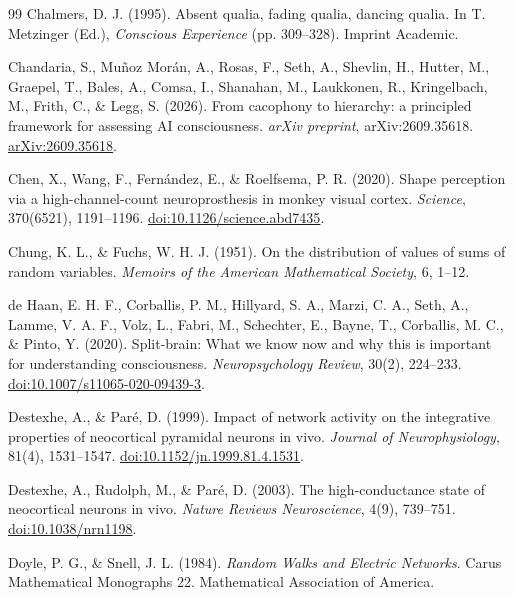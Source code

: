 \begin{thebibliography}{99}
 Chalmers, D. J. (1995). Absent qualia, fading qualia, dancing qualia. In T. Metzinger (Ed.), \textit{Conscious Experience} (pp. 309--328). Imprint Academic.

 Chandaria, S., Mu\~noz Mor\'an, A., Rosas, F., Seth, A., Shevlin, H., Hutter, M., Graepel, T., Bales, A., Comsa, I., Shanahan, M., Laukkonen, R., Kringelbach, M., Frith, C., \& Legg, S. (2026). From cacophony to hierarchy: a principled framework for assessing AI consciousness. \textit{arXiv preprint}, arXiv:2609.35618. \href{https://arxiv.org/abs/2609.35618}{arXiv:2609.35618}.

 Chen, X., Wang, F., Fern\'{a}ndez, E., \& Roelfsema, P. R. (2020). Shape perception via a high-channel-count neuroprosthesis in monkey visual cortex. \textit{Science}, 370(6521), 1191--1196. \href{https://doi.org/10.1126/science.abd7435}{doi:10.1126/science.abd7435}.

 Chung, K. L., \& Fuchs, W. H. J. (1951). On the distribution of values of sums of random variables. \textit{Memoirs of the American Mathematical Society}, 6, 1--12.

 de Haan, E. H. F., Corballis, P. M., Hillyard, S. A., Marzi, C. A., Seth, A., Lamme, V. A. F., Volz, L., Fabri, M., Schechter, E., Bayne, T., Corballis, M. C., \& Pinto, Y. (2020). Split-brain: What we know now and why this is important for understanding consciousness. \textit{Neuropsychology Review}, 30(2), 224--233. \href{https://doi.org/10.1007/s11065-020-09439-3}{doi:10.1007/s11065-020-09439-3}.

 Destexhe, A., \& Par\'{e}, D. (1999). Impact of network activity on the integrative properties of neocortical pyramidal neurons in vivo. \textit{Journal of Neurophysiology}, 81(4), 1531--1547. \href{https://doi.org/10.1152/jn.1999.81.4.1531}{doi:10.1152/jn.1999.81.4.1531}.

 Destexhe, A., Rudolph, M., \& Par\'{e}, D. (2003). The high-conductance state of neocortical neurons in vivo. \textit{Nature Reviews Neuroscience}, 4(9), 739--751. \href{https://doi.org/10.1038/nrn1198}{doi:10.1038/nrn1198}.

 Doyle, P. G., \& Snell, J. L. (1984). \textit{Random Walks and Electric Networks}. Carus Mathematical Monographs 22. Mathematical Association of America.


\end{thebibliography}
